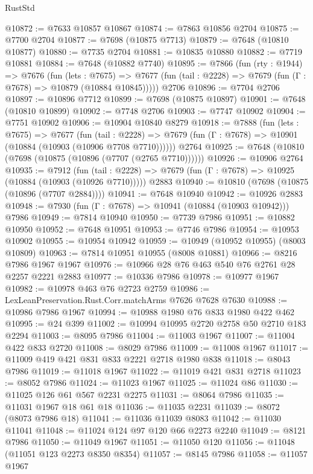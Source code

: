 \begin{lexlean}{RustStd}
\begin{coremodule}
{\begin{coremodule}
{{{{{{{{{{{{{{{{{{{{{{{{{{{{{{{{{{{{{{{{{{{{{{{{{{{{{@10872 := @7633 @10857 @10867
@10874 := @7863 @10856 @2704
@10875 := @7700 @2704
@10877 := @7698 (@10875 @7713)
@10879 := @7648 (@10810 @10877)
@10880 := @7735 @2704
@10881 := @10835 @10880
@10882 := @7719 @10881
@10884 := @7648 (@10882 @7740)
@10895 := @7866
    (fun (rty : @1944) =>
    @7676
      (fun (lets : @7675) =>
      @7677 (fun (tail : @2228) => @7679 (fun (Γ : @7678) => @10879 (@10884 @10845)))))
    @2706
@10896 := @7704 @2706
@10897 := @10896 @7712
@10899 := @7698 (@10875 @10897)
@10901 := @7648 (@10810 @10899)
@10902 := @7748 @2706
@10903 := @7747 @10902
@10904 := @7751 @10902
@10906 := @10904 @10840 @8279
@10918 := @7888
    (fun (lets : @7675) =>
    @7677
      (fun (tail : @2228) =>
      @7679 (fun (Γ : @7678) => @10901 (@10884 (@10903 (@10906 @7708 @7710))))))
    @2764
@10925 := @7648 (@10810 (@7698 (@10875 (@10896 (@7707 (@2765 @7710))))))
@10926 := @10906 @2764
@10935 := @7912
    (fun (tail : @2228) => @7679 (fun (Γ : @7678) => @10925 (@10884 (@10903 (@10926 @7710)))))
    @2883
@10940 := @10810 (@7698 (@10875 (@10896 (@7707 @2884))))
@10941 := @7648 @10940
@10942 := @10926 @2883
@10948 := @7930 (fun (Γ : @7678) => @10941 (@10884 (@10903 @10942))) @7986
@10949 := @7814 @10940
@10950 := @7739 @7986
@10951 := @10882 @10950
@10952 := @7648 @10951
@10953 := @7746 @7986
@10954 := @10953 @10902
@10955 := @10954 @10942
@10959 := @10949 (@10952 @10955) (@8003 @10809)
@10963 := @7814 @10951 @10955 (@8008 @10881)
@10966 := @8216 @7986 @1967 @1967
@10976 := @10966 @28 @76 @463 @540 @76 @2761 @28 @2257 @2221 @2883
@10977 := @10336 @7986
@10978 := @10977 @1967
@10982 := @10978 @463 @76 @2723 @2759
@10986 := LexLeanPreservation.Rust.Corr.matchArms @7626 @7628 @7630
@10988 := @10986 @7986 @1967
@10994 := @10988 @1980 @76 @833 @1980 @422 @462
@10995 := @24 @399
@11002 := @10994 @10995 @2720 @2758 @50 @2710 @183 @2294
@11003 := @8095 @7986
@11004 := @11003 @1967
@11007 := @11004 @422 @833 @2720
@11008 := @8029 @7986
@11009 := @11008 @1967
@11017 := @11009 @419 @421 @831 @833 @2221 @2718 @1980 @838
@11018 := @8043 @7986
@11019 := @11018 @1967
@11022 := @11019 @421 @831 @2718
@11023 := @8052 @7986
@11024 := @11023 @1967
@11025 := @11024 @86
@11030 := @11025 @126 @61 @567 @2231 @2275
@11031 := @8064 @7986
@11035 := @11031 @1967 @18 @61 @18
@11036 := @11035 @2231
@11039 := @8072 (@8073 @7986 @18)
@11041 := @11036 @11039 @8083
@11042 := @11030 @11041
@11048 := @11024 @124 @97 @120 @66 @2273 @2240
@11049 := @8121 @7986
@11050 := @11049 @1967
@11051 := @11050 @120
@11056 := @11048 (@11051 @123 @2273 @8350 @8354)
@11057 := @8145 @7986
@11058 := @11057 @1967
}}}}}}}}}}}}}}}}}}}}}}}}}}}}}}}}}}}}}}}}}}}}}}}}}}}}}
\end{coremodule}}
\end{coremodule}
\end{lexlean}
